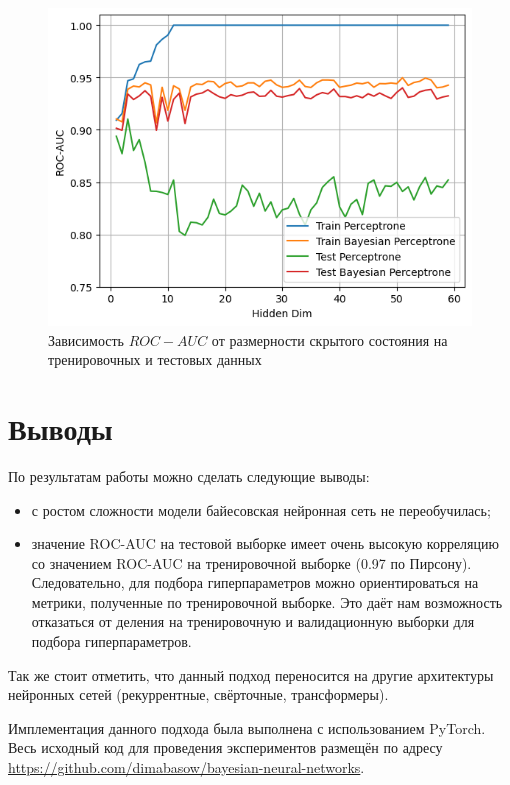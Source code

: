 \documentclass{article}
\begin{document}
\begin{figure}
    \centering
    \includegraphics[width=1\linewidth]{roc_auc.png}
    \caption{Зависимость $ROC-AUC$ от размерности скрытого состояния на тренировочных и тестовых данных}
    \label{fig:enter-label}
\end{figure}

\section{Выводы}
По результатам работы можно сделать следующие выводы:
\begin{itemize}
    \item с ростом сложности модели байесовская нейронная сеть не переобучилась;
    \item значение ROC-AUC на тестовой выборке имеет очень высокую корреляцию со значением ROC-AUC на тренировочной выборке (0.97 по Пирсону). Следовательно, для подбора гиперпараметров можно ориентироваться на метрики, полученные по тренировочной выборке. Это даёт нам возможность отказаться от деления на тренировочную и валидационную выборки для подбора гиперпараметров.
\end{itemize}

Так же стоит отметить, что данный подход переносится на другие архитектуры нейронных сетей (рекуррентные, свёрточные, трансформеры).

Имплементация данного подхода была выполнена с использованием PyTorch. Весь исходный код для проведения экспериментов размещён по адресу \url{https://github.com/dimabasow/bayesian-neural-networks}.
\end{document}
